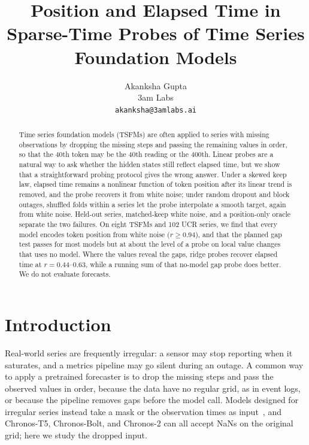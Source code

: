 \documentclass{article}
\title{Position and Elapsed Time in Sparse-Time Probes of Time Series Foundation Models}
\author{%
  Akanksha Gupta\\
  3am Labs\\
  \texttt{akanksha@3amlabs.ai}
}
\begin{document}
\maketitle

\begin{abstract}
Time series foundation models (TSFMs) are often applied to series with missing observations by dropping the missing steps and passing the remaining values in order, so that the 40th token may be the 40th reading or the 400th.
Linear probes are a natural way to ask whether the hidden states still reflect elapsed time, but we show that a straightforward probing protocol gives the wrong answer.
Under a skewed keep law, elapsed time remains a nonlinear function of token position after its linear trend is removed, and the probe recovers it from white noise; under random dropout and block outages, shuffled folds within a series let the probe interpolate a smooth target, again from white noise.
Held-out series, matched-keep white noise, and a position-only oracle separate the two failures.
On eight TSFMs and 102 UCR series, we find that every model encodes token position from white noise ($r \ge 0.94$), and that the planned gap test passes for most models but at about the level of a probe on local value changes that uses no model.
Where the values reveal the gaps, ridge probes recover elapsed time at $r = 0.44$--$0.63$, while a running sum of that no-model gap probe does better.
We do not evaluate forecasts.
\end{abstract}

\section{Introduction}
\label{sec:intro}

Real-world series are frequently irregular: a sensor may stop reporting when it saturates, and a metrics pipeline may go silent during an outage.
A common way to apply a pretrained forecaster is to drop the missing steps and pass the observed values in order, because the data have no regular grid, as in event logs, or because the pipeline removes gaps before the model call.
Models designed for irregular series instead take a mask or the observation times as input~\citep{che2018grud,rubanova2019latent,kidger2020ncde,shukla2021mtan}, and Chronos-T5, Chronos-Bolt, and Chronos-2 can all accept NaNs on the original grid; here we study the dropped input.
\end{document}
